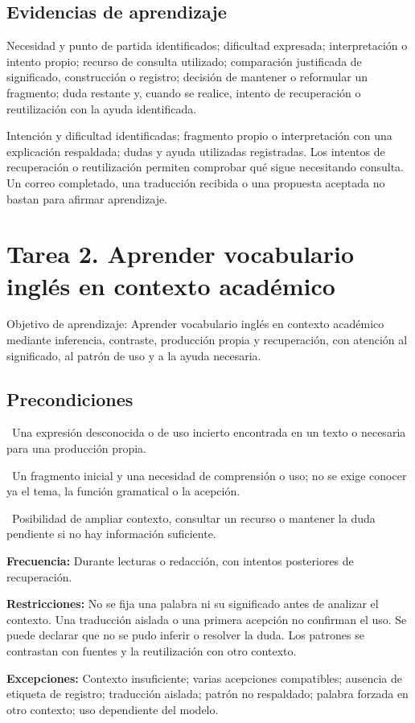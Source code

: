 \documentclass[10pt,a4paper]{article}
\begin{document}
\subsection*{Evidencias de aprendizaje}
Necesidad y punto de partida identificados; dificultad expresada; interpretación o intento propio; recurso de consulta utilizado; comparación justificada de significado, construcción o registro; decisión de mantener o reformular un fragmento; duda restante y, cuando se realice, intento de recuperación o reutilización con la ayuda identificada.\par
Intención y dificultad identificadas; fragmento propio o interpretación con una explicación respaldada; dudas y ayuda utilizadas registradas. Los intentos de recuperación o reutilización permiten comprobar qué sigue necesitando consulta. Un correo completado, una traducción recibida o una propuesta aceptada no bastan para afirmar aprendizaje.\par
\clearpage
\section*{Tarea 2. Aprender vocabulario inglés en contexto académico}
Objetivo de aprendizaje: Aprender vocabulario inglés en contexto académico mediante inferencia, contraste, producción propia y recuperación, con atención al significado, al patrón de uso y a la ayuda necesaria.\par
\subsection*{Precondiciones}
{\setlength{\parskip}{2pt}\textbullet\ Una expresión desconocida o de uso incierto encontrada en un texto o necesaria para una producción propia.\par}
{\setlength{\parskip}{2pt}\textbullet\ Un fragmento inicial y una necesidad de comprensión o uso; no se exige conocer ya el tema, la función gramatical o la acepción.\par}
{\setlength{\parskip}{2pt}\textbullet\ Posibilidad de ampliar contexto, consultar un recurso o mantener la duda pendiente si no hay información suficiente.\par}
\textbf{Frecuencia:} Durante lecturas o redacción, con intentos posteriores de recuperación.\par
\textbf{Restricciones:} No se fija una palabra ni su significado antes de analizar el contexto. Una traducción aislada o una primera acepción no confirman el uso. Se puede declarar que no se pudo inferir o resolver la duda. Los patrones se contrastan con fuentes y la reutilización con otro contexto.\par
\textbf{Excepciones:} Contexto insuficiente; varias acepciones compatibles; ausencia de etiqueta de registro; traducción aislada; patrón no respaldado; palabra forzada en otro contexto; uso dependiente del modelo.\par
\end{document}

